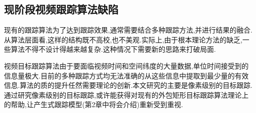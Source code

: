 \subsection{现阶段视频跟踪算法缺陷}
现有的跟踪算法为了达到跟踪效果,通常需要结合多种跟踪方法,并进行结果的融合.从算法层面看,这样的结构既不高校,也不美观.实际上,由于根本理论方法的缺乏,一些算法不得不设计得越来越复杂.这种情况下需要新的思路来打破局面.
\par
视频目标跟踪算法由于要面临视频时间和空间纬度的大量数据,单位时间接受到的信息量极大.目前的多种跟踪方式均无法准确的从这些信息中提取到最少量的有效信息.算法的质的提升任然需要理论的创新.本文研究的主要是像素级别的目标跟踪.通过研究像素级别的目标跟踪,或许能获得对现有的外包矩形目标跟踪算法理论上的帮助,让产生式跟踪模型(第2章中将会介绍)重新受到重视.

